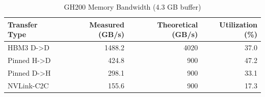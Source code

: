 \begin{table}[h]
\centering
\caption{GH200 Memory Bandwidth (4.3 GB buffer)}
\label{tab:bandwidth}
\begin{tabular}{lrrr}
\hline
Transfer Type & Measured (GB/s) & Theoretical (GB/s) & Utilization (\%) \\
\hline
HBM3 D->D & 1488.2 & 4020 & 37.0 \\
Pinned H->D & 424.8 & 900 & 47.2 \\
Pinned D->H & 298.1 & 900 & 33.1 \\
NVLink-C2C & 155.6 & 900 & 17.3 \\
\hline
\end{tabular}
\end{table}
